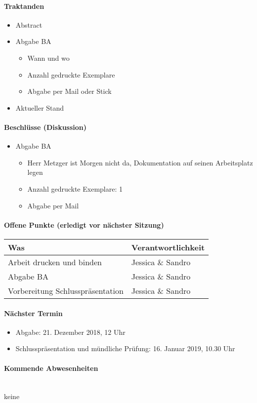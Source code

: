 \paragraph{Traktanden}
\begin{itemize}
	\item Abstract	
	\item Abgabe BA
	\begin{itemize}
		\item Wann und wo
		\item Anzahl gedruckte Exemplare
		\item Abgabe per Mail oder Stick
	\end{itemize}	
	\item Aktueller Stand
\end{itemize}

\paragraph{Beschlüsse (Diskussion)}
\begin{itemize}	
	\item Abgabe BA
	\begin{itemize}
		\item Herr Metzger ist Morgen nicht da, Dokumentation auf seinen Arbeitsplatz legen
		\item Anzahl gedruckte Exemplare: 1
		\item Abgabe per Mail
	\end{itemize}	
\end{itemize}

\paragraph{Offene Punkte (erledigt vor nächster Sitzung)} \mbox{}
\begin{table}[H]
	\centering
	\begin{tabularx}{\textwidth}{X | p{4.5cm}}
		\rowcolor{gray!50}
		\textbf{Was} & \textbf{Verantwortlichkeit} \\
		\hline	
		Arbeit drucken und binden & Jessica \& Sandro \\
		Abgabe BA & Jessica \& Sandro \\
		Vorbereitung Schlusspräsentation & Jessica \& Sandro \\
	\end{tabularx}
	\label{tab:my-label}
\end{table}

\paragraph{Nächster Termin}
\begin{itemize}	
	\item Abgabe: 21. Dezember 2018, 12 Uhr
	\item Schlusspräsentation und mündliche Prüfung: 16. Januar 2019, 10.30 Uhr
\end{itemize}

\paragraph{Kommende Abwesenheiten} \mbox{}\\
keine




